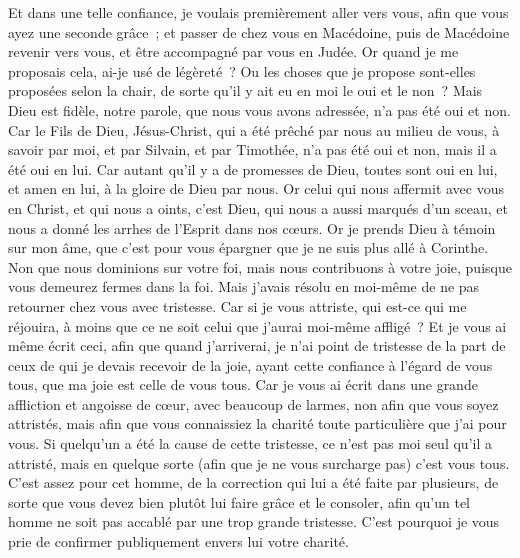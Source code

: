 \begin{multicols}{2}
Et dans une telle confiance, je voulais premièrement aller vers vous, afin que vous ayez une seconde grâce~;
et passer de chez vous en Macédoine, puis de Macédoine revenir vers vous, et être accompagné par vous en Judée.
Or quand je me proposais cela, ai-je usé de légèreté~? Ou les choses que je propose sont-elles proposées selon la chair, de sorte qu'il y ait eu en moi le oui et le non~?
Mais Dieu est fidèle, notre parole, que nous vous avons adressée, n'a pas été oui et non.
Car le Fils de Dieu, Jésus-Christ, qui a été prêché par nous au milieu de vous, à savoir par moi, et par Silvain, et par Timothée, n'a pas été oui et non, mais il a été oui en lui.
Car autant qu'il y a de promesses de Dieu, toutes sont oui en lui, et amen en lui, à la gloire de Dieu par nous.
Or celui qui nous affermit avec vous en Christ, et qui nous a oints, c'est Dieu,
qui nous a aussi marqués d'un sceau, et nous a donné les arrhes de l'Esprit dans nos cœurs.
Or je prends Dieu à témoin sur mon âme, que c'est pour vous épargner que je ne suis plus allé à Corinthe.
Non que nous dominions sur votre foi, mais nous contribuons à votre joie, puisque vous demeurez fermes dans la foi.
\VerseOne{}Mais j'avais résolu en moi-même de ne pas retourner chez vous avec tristesse.
Car si je vous attriste, qui est-ce qui me réjouira, à moins que ce ne soit celui que j'aurai moi-même affligé~?
Et je vous ai même écrit ceci, afin que quand j'arriverai, je n'ai point de tristesse de la part de ceux de qui je devais recevoir de la joie, ayant cette confiance à l'égard de vous tous, que ma joie est celle de vous tous.
Car je vous ai écrit dans une grande affliction et angoisse de cœur, avec beaucoup de larmes, non afin que vous soyez attristés, mais afin que vous connaissiez la charité toute particulière que j'ai pour vous.
Si quelqu'un a été la cause de cette tristesse, ce n'est pas moi seul qu'il a attristé, mais en quelque sorte (afin que je ne vous surcharge pas) c'est vous tous.
C'est assez pour cet homme, de la correction qui lui a été faite par plusieurs,
de sorte que vous devez bien plutôt lui faire grâce et le consoler, afin qu'un tel homme ne soit pas accablé par une trop grande tristesse.
C'est pourquoi je vous prie de confirmer publiquement envers lui votre charité.

\end{multicols}
